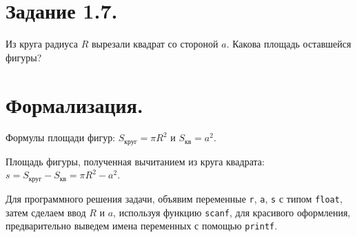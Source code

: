  
\usepackage[russian]{babel}
\newcommand{\theauthor}{Фамилия И.О.}





\graphicspath{{img/}}




\maketitleguap


\section{Задание 1.7.}

Из круга радиуса $R$ вырезали квадрат со стороной $a$. Какова площадь оставшейся фигуры?


\section{Формализация.}

Формулы площади фигур: $ S_{\text{круг}} = \pi R^2 $ и $ S_{\text{кв}} = a^2 $.

Площадь фигуры, полученная вычитанием из круга квадрата: $ s = S_{\text{круг}} - S_{\text{кв}} = \pi R^2 - a^2  $.

Для программного решения задачи, объявим переменные \texttt{r}, \texttt{a}, \texttt{s} с типом \texttt{float},
затем сделаем ввод $R$ и $a$, используя функцию \texttt{scanf}, 
для красивого оформления, предварительно выведем имена переменных с помощью \texttt{printf}.


